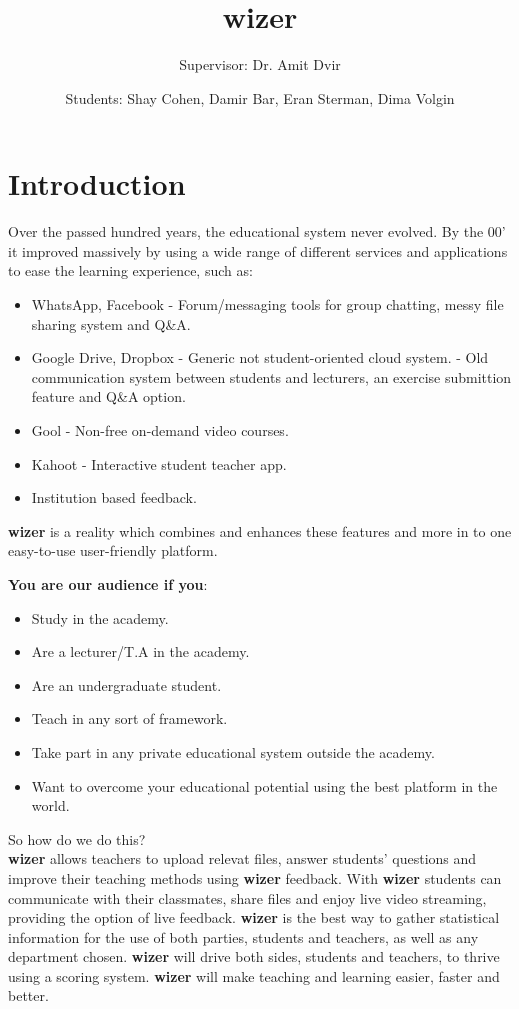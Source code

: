 \documentclass{article}
\title{wizer}
\author{Supervisor: Dr. Amit Dvir}
\author{Students: Shay Cohen, Damir Bar, Eran Sterman, Dima Volgin}
\begin{document}
\maketitle

\section{Introduction}

Over the passed hundred years, the educational system never evolved. By the 00' it improved massively by using a wide range of different services and applications to ease the learning experience, such as: 
\begin{itemize}
\item WhatsApp, Facebook - Forum/messaging tools for group chatting, messy file sharing system and Q&A.
\item Google Drive, Dropbox - Generic not student-oriented cloud system.
\itemMoodle - Old communication system between students and lecturers, an exercise submittion feature and Q&A option.
\item Gool - Non-free on-demand video courses.
\item Kahoot - Interactive student teacher app.
\item Institution based feedback.
\end{itemize}
\textbf{wizer}  is a reality which combines and enhances these features and more in to one easy-to-use user-friendly platform.

\textbf{You are our audience if you}:
\begin{itemize}
\item Study in the academy.
\item Are a lecturer/T.A in the academy.
\item Are an undergraduate student.
\item Teach in any sort of framework.  
\item Take part in any private educational system outside the academy.
\item Want to overcome your educational potential using the best platform in the world.
\end{itemize}
So how do we do this?\\
\textbf{wizer}  allows teachers to upload relevat files, answer students' questions  and improve their teaching methods using \textbf{wizer}  feedback. With \textbf{wizer}  students can communicate with their classmates, share files and enjoy live video streaming, providing the option of live feedback. \textbf{wizer}  is the best way to gather statistical information for the use of both parties, students and teachers, as well as any department chosen. \textbf{wizer}  will drive both sides, students and teachers, to thrive using a scoring system. \textbf{wizer}  will make teaching and learning easier, faster and better.
\end{document}
